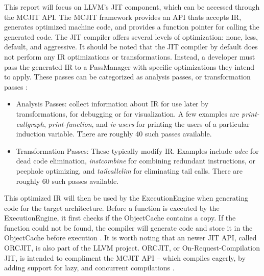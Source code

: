 This report will focus on LLVM's JIT component, which can be accessed through the MCJIT API.
The MCJIT framework provides an API thats accepts IR, generates optimized machine code, and provides a function pointer for calling the generated code.
The JIT compiler offers several levels of optimization: none, less, default, and aggressive.
It should be noted that the JIT compiler by default does not perform any IR optimizations or transformations.
Instead, a developer must pass the generated IR to a PassManager with specific optimizations they intend to apply.
These passes can be categorized as analysis passes, or transformation passes \cite{LLVM_Passes}:
\begin{itemize}
    \item Analysis Passes: collect information about IR for use later by transformations, for debugging or for visualization. 
    A few examples are \textit{print-callgraph}, \textit{print-function}, and \textit{iv-users} for printing the users of a particular induction variable. There are roughly 40 such passes available.
    \item Transformation Passes: These typically modify IR. Examples include \textit{adce} for dead code elimination, \textit{instcombine} for combining redundant instructions, or peephole optimizing, and \textit{tailcallelim} for eliminating tail calls. There are roughly 60 such passes available.
\end{itemize}
This optimized IR will then be used by the ExecutionEngine when generating code for the target architecture.
Before a function is executed by the ExecutionEngine, it first checks if the ObjectCache contains a copy.
If the function could not be found, the compiler will generate code and store it in the ObjectCache before execution \cite{LLVM_MCJIT}.
It is worth noting that an newer JIT API, called ORCJIT, is also part of the LLVM project.
ORCJIT, or On-Request-Compilation JIT, is intended to compliment the MCJIT API -- which compiles eagerly, by adding support for lazy, and concurrent compilations \cite{LLVM_ORCJIT}.